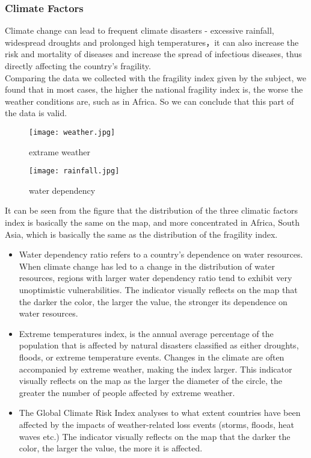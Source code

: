 \documentclass{mcmthesis}
\begin{document}
\subsubsection{Climate Factors}
Climate change can lead to frequent climate disasters - excessive rainfall, widespread droughts and prolonged high temperatures，it can also increase the risk and mortality of diseases and increase the spread of infectious diseases, thus directly affecting the country's fragility.\\
Comparing the data we collected with the fragility index given by the subject, we found that in most cases, the higher the national fragility index is, the worse the weather conditions are, such as in Africa. So we can conclude that this part of the data is valid.\\
\begin{figure}[h]
  \centering
  \begin{minipage}[h]{0.48\textwidth}
  \centering
  \texttt{[image: weather.jpg]}
  \caption{extrame weather}
  \end{minipage}
  \begin{minipage}[h]{0.48\textwidth}
  \centering
  \texttt{[image: rainfall.jpg]}
  \caption{water dependency}
  \end{minipage}
\end{figure}
\newpage
It can be seen from the figure that the distribution of the three climatic factors index is basically the same on the map, and more concentrated in Africa, South Asia, which is basically the same as the distribution of the fragility index.
\begin{itemize}
  \item Water dependency ratio refers to a country's dependence on water resources. When climate change has led to a change in the distribution of water resources, regions with larger water dependency ratio tend to exhibit very unoptimistic vulnerabilities. The indicator visually reflects on the map that the darker the color, the larger the value, the stronger its dependence on water resources.
  \item Extreme temperatures index, is the annual average percentage of the population that is affected by natural disasters classified as either droughts, floods, or extreme temperature events. Changes in the climate are often accompanied by extreme weather, making the index larger. This indicator visually reflects on the map as the larger the diameter of the circle, the greater the number of people affected by extreme weather.
  \item The Global Climate Risk Index analyses to what extent countries have been affected by the impacts of weather-related loss events (storms, floods, heat waves etc.) The indicator visually reflects on the map that the darker the color, the larger the value, the more it is affected.
\end{itemize}
\end{document}
